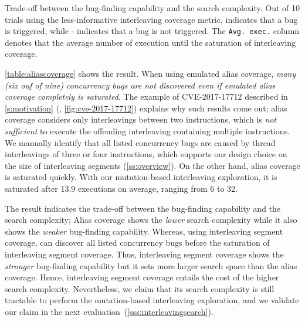 %
\begin{table}[t]
  \small
  \centering
  
  \caption{Trade-off between the bug-finding capability and the search
    complexity. Out of 10 trials using the less-informative
    interleaving coverage metric, \checkmark\xspace indicates that a
    bug is triggered, while - indicates that a bug is not
    triggered. The \texttt{Avg. exec.}  column denotes that the
    average number of execution until the saturation of interleaving
    coverage.}
  \label{table:aliascoverage}
  \vspace{-5pt}
\end{table}
%
\autoref{table:aliascoverage} shows the result.
%
When using emulated alias coverage, \textit{many (six ouf of nine)
concurrency bugs are not discovered even if emulated alias coverage
completely is saturated}.
%
The example of CVE-2017-17712 described in \autoref{s:motivation}
(\ie, \autoref{fig:cve-2017-17712}) explains why such results come 
out; alias coverage considers only interleavings between two
instructions, which is \textit{not sufficient} to execute the
offending interleaving containing multiple instructions. We manually 
identify that all
listed concurrency bugs are caused by thread interleavings of three or
four instructions, which supports our design choice on the size of
interleaving segments (\autoref{ss:overview}).
%
On the other hand, alias coverage is saturated quickly. With
our mutation-based interleaving exploration, it is saturated after 13.9
executions on average, ranging from 6 to 32.
%

The result indicates the trade-off between the bug-finding
capability and the search complexity; Alias coverage shows the
\textit{lower} search complexity while it also shows the \textit{weaker}
bug-finding capability.
%
Whereas, using interleaving segment coverage, \sys can discover all listed
concurrency bugs before the saturation of interleaving
segment coverage. Thus, interleaving segment coverage shows the
\textit{stronger} bug-finding capability but it sets more larger search 
space than the alias coverage.
Hence, interleaving segment coverage entails the cost of the
higher search complexity. Nevertheless, we claim that 
its search complexity is still tractable to perform the mutation-based 
interleaving exploration, and we validate our claim  in the next
evaluation~(\autoref{sss:interleavingsearch}).






